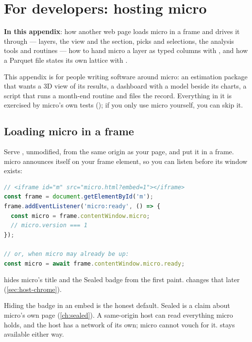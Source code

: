 \chapter{For developers: hosting micro}\label{app:host}\label{ch:host}

\begin{goals}
\textbf{In this appendix}: how another web page loads micro in a frame and drives it through
 — layers, the view and the section, picks and selections, the analysis tools
and routines — how to hand micro a layer as typed columns with , and how a Parquet
file states its own lattice with .
\end{goals}

This appendix is for people writing software around micro: an estimation package that wants a 3D
view of its results, a dashboard with a model beside its charts, a script that runs a month-end
routine and files the record. Everything in it is exercised by micro's own tests
(); if you only use micro yourself, you can skip it.

\section{Loading micro in a frame}\label{sec:host-frame}

Serve , unmodified, from the same origin as your page, and put it in a frame.
micro announces itself on your frame element, so you can listen before its window exists:

\begin{lstlisting}[language=js]
// <iframe id="m" src="micro.html?embed=1"></iframe>
const frame = document.getElementById('m');
frame.addEventListener('micro:ready', () => {
  const micro = frame.contentWindow.micro;
  // micro.version === 1
});

// or, when micro may already be up:
const micro = await frame.contentWindow.micro.ready;
\end{lstlisting}

 hides micro's title and the Sealed badge from the first paint. 
changes that later (\cref{sec:host-chrome}).

\begin{why}
Hiding the badge in an embed is the honest default. Sealed is a claim about micro's own page
(\cref{ch:sealed}). A same-origin host can read everything micro holds, and the host has a network
of its own; micro cannot vouch for it.  stays available either
way.
\end{why}


